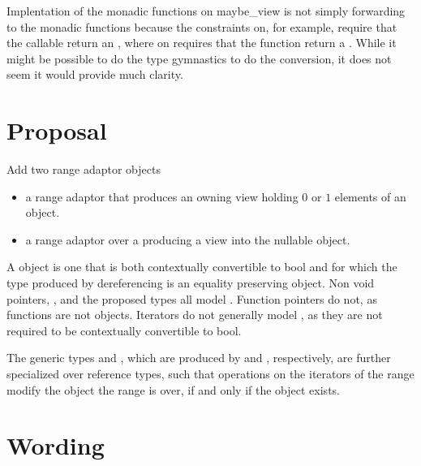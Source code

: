 \documentclass[a4paper,10pt,oneside,openany,final,article]{memoir}
\begin{document}
Implentation of the monadic functions on maybe_view is not simply forwarding to the  monadic functions because the constraints on, for example,  require that the callable return an , where  on  requires that the function return a . While it might be possible to do the type gymnastics to do the conversion, it does not seem it would provide much clarity.


\chapter{Proposal}


Add two range adaptor objects

\begin{itemize}
\item
   a range adaptor that produces an owning view holding $0$ or $1$ elements of an object.
\item
   a range adaptor over a  producing a view into the nullable object.
\end{itemize}

A  object is one that is both contextually convertible to bool and for which the type produced by dereferencing is an equality preserving object. Non void pointers, , and the proposed  \cite{P0323R9} types all model . Function pointers do not, as functions are not objects. Iterators do not generally model , as they are not required to be contextually convertible to bool.

The generic types  and , which are produced by  and , respectively, are further specialized over reference types, such that operations on the iterators of the range modify the object the range is over, if and only if the object exists.


\chapter{Wording}
\end{document}

